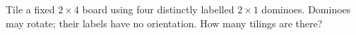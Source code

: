 Tile a fixed $2\times4$ board using four distinctly labelled $2\times1$ dominoes. Dominoes may rotate; their labels have no orientation. How many tilings are there?

